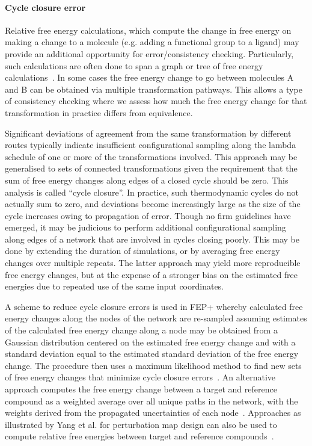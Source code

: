 \documentclass[9pt,bestpractices,pubversion]{livecoms}
\begin{document}
\paragraph{Cycle closure error}
Relative free energy calculations, which compute the change in free energy on making a change to a molecule (e.g. adding a functional group to a ligand) may provide an additional opportunity for error/consistency checking. Particularly, such calculations are often done to span a graph or tree of free energy calculations~\cite{xu2019optimal,wang2013modeling,liu2013lead}. In some cases the free energy change to go between molecules A and B can be obtained via multiple transformation pathways. This allows a type of consistency checking where we assess how much the free energy change for that transformation in practice differs from equivalence. 

Significant deviations of agreement from the same transformation by different routes  typically indicate insufficient configurational sampling along the lambda schedule of one or more of the transformations involved. This approach may be generalised to sets of connected transformations given the requirement that the sum of free energy changes along edges of a closed cycle should be zero. This analysis is called ``cycle closure''. In practice, such thermodynamic cycles do not actually sum to zero, and deviations become increasingly large as the size of the cycle increases owing to propagation of error. Though no firm guidelines have emerged, it may be judicious to perform additional configurational sampling along edges of a network that are involved in cycles closing poorly. This may be done by extending the duration of simulations, or by averaging free energy changes over multiple repeats. The latter approach may yield more reproducible free energy changes, but at the expense of a stronger bias on the estimated free energies due to repeated use of the same input coordinates.

A scheme to reduce cycle closure errors is used in FEP+ whereby calculated free energy changes along the nodes of the network are re-sampled assuming estimates of the calculated free energy change along a node may be obtained from a Gaussian distribution centered on the estimated free energy change and with a standard deviation equal to the estimated standard deviation of the free energy change. The procedure then uses a maximum likelihood method to find new sets of free energy changes that minimize cycle closure errors~\cite{wang2013modeling}. An alternative approach computes the free energy change between a target and reference compound as a weighted average over all unique paths in the network, with the weights derived from the propagated uncertainties of each node~\cite{mey2016blinded}. Approaches as illustrated by Yang et al. for perturbation map design can also be used to compute relative free energies between target and reference compounds~\cite{yang2020optimal}.
\end{document}
